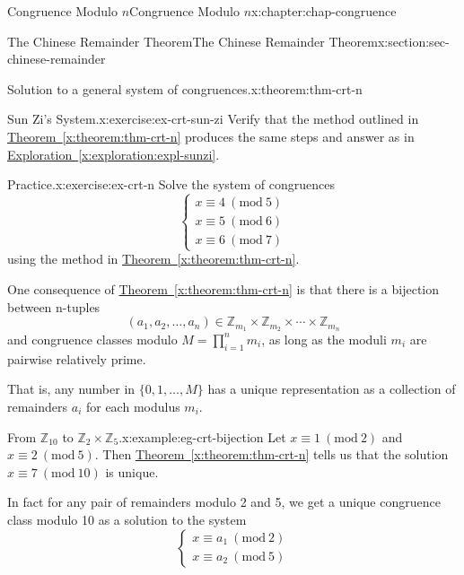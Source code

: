 \documentclass[oneside,10pt,]{book}
\newcommand{\xreffont}{\relax}
\numberwithin{equation}{section}
\newcommand{\Mod}[1]{\ \left(\mathrm{mod}\ #1\right)}
\begin{document}
\begin{chapterptx}{Congruence Modulo \(n\)}{}{Congruence Modulo \(n\)}{}{}{x:chapter:chap-congruence}
\begin{sectionptx}{The Chinese Remainder Theorem}{}{The Chinese Remainder Theorem}{}{}{x:section:sec-chinese-remainder}
\begin{theorem}{Solution to a general system of congruences.}{}{x:theorem:thm-crt-n}
\end{theorem}
\begin{inlineexercise}{Sun Zi's System.}{x:exercise:ex-crt-sun-zi}%
Verify that the method outlined in \hyperref[x:theorem:thm-crt-n]{Theorem~{\xreffont\ref{x:theorem:thm-crt-n}}} produces the same steps and answer as in \hyperref[x:exploration:expl-sunzi]{Exploration~{\xreffont\ref{x:exploration:expl-sunzi}}}.%
\end{inlineexercise}%
\begin{inlineexercise}{Practice.}{x:exercise:ex-crt-n}%
Solve the system of congruences%
\begin{equation*}
\begin{cases} x \equiv 4 \Mod{5} \\ x \equiv 5 \Mod{6} \\ x \equiv 6 \Mod{7} \end{cases}
\end{equation*}
using the method in \hyperref[x:theorem:thm-crt-n]{Theorem~{\xreffont\ref{x:theorem:thm-crt-n}}}.%
\end{inlineexercise}%
One consequence of \hyperref[x:theorem:thm-crt-n]{Theorem~{\xreffont\ref{x:theorem:thm-crt-n}}} is that there is a bijection between n-tuples%
\begin{equation*}
(a_1,a_2,\ldots,a_n) \in \mathbb{Z}_{m_1} \times \mathbb{Z}_{m_2} \times \cdots \times \mathbb{Z}_{m_n}
\end{equation*}
and congruence classes modulo \(M = \prod_{i=1}^n m_i\), as long as the moduli \(m_i\) are pairwise relatively prime.%
\par
That is, any number in \(\{0,1,\ldots,M\}\) has a unique representation as a collection of remainders \(a_i\) for each modulus \(m_i\).%
\begin{example}{From \(\mathbb{Z}_{10}\) to \(\mathbb{Z}_2 \times \mathbb{Z}_5\).}{x:example:eg-crt-bijection}%
Let \(x \equiv 1 \Mod{2}\) and \(x \equiv 2 \Mod{5}\). Then \hyperref[x:theorem:thm-crt-n]{Theorem~{\xreffont\ref{x:theorem:thm-crt-n}}} tells us that the solution \(x \equiv 7 \Mod{10}\) is unique.%
\par
In fact for any pair of remainders modulo 2 and 5, we get a unique congruence class modulo 10 as a solution to the system%
\begin{equation*}
\begin{cases} x \equiv a_1 \Mod{2} \\ x \equiv a_2 \Mod{5}\end{cases}
\end{equation*}

\end{example}
\end{sectionptx}
\end{chapterptx}
\end{document}
